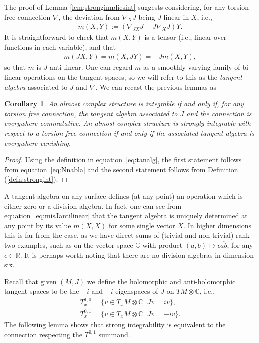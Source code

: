 \documentclass[pdftex]{sigma}
\newtheorem{cor}[thm]{Corollary}
\numberwithin{equation}{section}
\newcommand{\R}{\mathbb{R}}
\newcommand{\CC}{\mathbb{C}}
\begin{document}
The proof of Lemma \ref{lem;strongimpliesint} suggests considering, for any torsion free connection $\nabla$, the deviation from $\nabla_X J$ being $J$-linear in $X$, i.e.,
\begin{gather} \label{eq:tanalg}
m(X,Y) := ( \nabla_{JX} J - J \nabla_X J ) Y.
\end{gather}
It is straightforward to check that $m(X,Y)$ is a tensor (i.e., linear over functions in each variable), and that
\begin{gather} \label{eq:misJantilinear}
m(JX,Y) = m(X,JY) = - J m(X,Y),
\end{gather}
so that $m$ is $J$ anti-linear. One can regard $m$ as a smoothly varying family of bi-linear operations on the tangent spaces, so we will refer to this as the \emph{tangent algebra} associated to $J$ and $\nabla$.
We can recast the previous lemmas as

\begin{cor} \label{cor:Jintcomm}
 An almost complex structure is integrable if and only if, for any torsion free connection, the tangent algebra associated to $J$ and the connection is \emph{everywhere commutative}. An almost complex structure is strongly integrable with respect to a torsion free connection if and only if the associated tangent algebra is \emph{everywhere vanishing}.
 \end{cor}

 \begin{proof}Using the definition in equation~\eqref{eq:tanalg}, the first statement follows from equation~\eqref{eq:Nnabla} and the second
statement follows from Definition (\ref{defn:strongint}).
 \end{proof}

\begin{rmk}A tangent algebra on any surface defines (at any point) an operation which is either zero or a division algebra. In fact, one can see from equation~\eqref{eq:misJantilinear} that the tangent algebra is uniquely determined at any point by its value $m(X,X)$ for some single vector $X$. In higher dimensions this is far from the case, as we have direct sums of (trivial and non-trivial) rank two examples, such as on the vector space $\CC$ with product $(a,b) \mapsto \epsilon \overline{ab}$, for any $\epsilon \in \R$. It is perhaps worth noting that there are no division algebras in dimension six.
\end{rmk}

Recall that given $(M,J)$ we define the holomorphic and anti-holomorphic tangent spaces to be the $+i$ and $-i$ eigenspaces of $J$ on $TM \otimes \CC$, i.e.,
\begin{gather*}
T^{1,0}_x = \{ v \in T_xM \otimes \CC \,| \, Jv = i v\}, \\
T^{0,1}_x = \{ v \in T_xM \otimes \CC\, | \, Jv = - i v\}.
\end{gather*}
The following lemma shows that strong integrability is equivalent to the connection respecting the $T^{0,1}$ summand.
\end{document}
